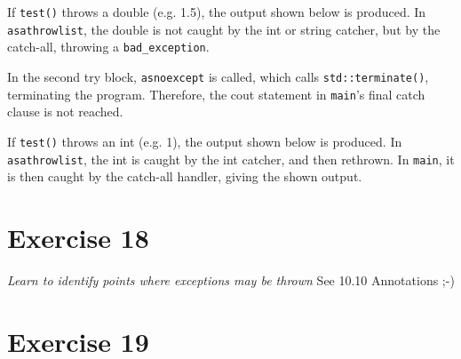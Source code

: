 \documentclass[12pt]{article}
\newcommand{\desc}[1]{\textit{#1} \vspace{1em}}
\begin{document}
If \texttt{test()} throws a double (e.g. 1.5), the output shown below is produced. In \texttt{asathrowlist}, the double is not caught by the int or string catcher, but by the catch-all, throwing a \texttt{bad\_exception}. 

In the second try block, \texttt{asnoexcept} is called, which calls \texttt{std::terminate()}, terminating the program. Therefore, the cout statement in \texttt{main}'s final catch clause is not reached. 



If \texttt{test()} throws an int (e.g. 1), the output shown below is produced. In \texttt{asathrowlist}, the int is caught by the int catcher, and then rethrown. In \texttt{main}, it is then caught by the catch-all handler, giving the shown output. 





\clearpage
\section*{Exercise 18}
\desc{Learn to identify points where exceptions may be thrown}
See 10.10 Annotations ;-)

\clearpage
\section*{Exercise 19}
\desc{}


\clearpage
\end{document}
